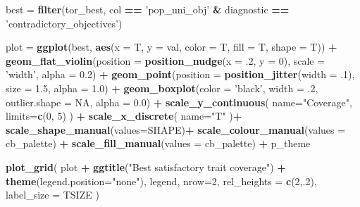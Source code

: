 \documentclass[]{book}
\newenvironment{Shaded}{\begin{snugshade}}{\end{snugshade}}
\newcommand{\DataTypeTok}[1]{\textcolor[rgb]{0.13,0.29,0.53}{#1}}
\newcommand{\DecValTok}[1]{\textcolor[rgb]{0.00,0.00,0.81}{#1}}
\newcommand{\FloatTok}[1]{\textcolor[rgb]{0.00,0.00,0.81}{#1}}
\newcommand{\KeywordTok}[1]{\textcolor[rgb]{0.13,0.29,0.53}{\textbf{#1}}}
\newcommand{\NormalTok}[1]{#1}
\newcommand{\OperatorTok}[1]{\textcolor[rgb]{0.81,0.36,0.00}{\textbf{#1}}}
\newcommand{\OtherTok}[1]{\textcolor[rgb]{0.56,0.35,0.01}{#1}}
\newcommand{\StringTok}[1]{\textcolor[rgb]{0.31,0.60,0.02}{#1}}
\begin{document}
\begin{Shaded}
\begin{Highlighting}[]
\NormalTok{best =}\StringTok{ }\KeywordTok{filter}\NormalTok{(tor_best, col }\OperatorTok{==}\StringTok{ 'pop_uni_obj'} \OperatorTok{&}\StringTok{ }\NormalTok{diagnostic }\OperatorTok{==}\StringTok{ 'contradictory_objectives'}\NormalTok{)}

\NormalTok{plot =}\StringTok{ }\KeywordTok{ggplot}\NormalTok{(best, }\KeywordTok{aes}\NormalTok{(}\DataTypeTok{x =}\NormalTok{ T, }\DataTypeTok{y =}\NormalTok{ val, }\DataTypeTok{color =}\NormalTok{ T, }\DataTypeTok{fill =}\NormalTok{ T, }\DataTypeTok{shape =}\NormalTok{ T)) }\OperatorTok{+}
\StringTok{  }\KeywordTok{geom_flat_violin}\NormalTok{(}\DataTypeTok{position =} \KeywordTok{position_nudge}\NormalTok{(}\DataTypeTok{x =} \FloatTok{.2}\NormalTok{, }\DataTypeTok{y =} \DecValTok{0}\NormalTok{), }\DataTypeTok{scale =} \StringTok{'width'}\NormalTok{, }\DataTypeTok{alpha =} \FloatTok{0.2}\NormalTok{) }\OperatorTok{+}
\StringTok{  }\KeywordTok{geom_point}\NormalTok{(}\DataTypeTok{position =} \KeywordTok{position_jitter}\NormalTok{(}\DataTypeTok{width =} \FloatTok{.1}\NormalTok{), }\DataTypeTok{size =} \FloatTok{1.5}\NormalTok{, }\DataTypeTok{alpha =} \FloatTok{1.0}\NormalTok{) }\OperatorTok{+}
\StringTok{  }\KeywordTok{geom_boxplot}\NormalTok{(}\DataTypeTok{color =} \StringTok{'black'}\NormalTok{, }\DataTypeTok{width =} \FloatTok{.2}\NormalTok{, }\DataTypeTok{outlier.shape =} \OtherTok{NA}\NormalTok{, }\DataTypeTok{alpha =} \FloatTok{0.0}\NormalTok{) }\OperatorTok{+}
\StringTok{  }\KeywordTok{scale_y_continuous}\NormalTok{(}
    \DataTypeTok{name=}\StringTok{"Coverage"}\NormalTok{,}
    \DataTypeTok{limits=}\KeywordTok{c}\NormalTok{(}\DecValTok{0}\NormalTok{, }\DecValTok{5}\NormalTok{)}
\NormalTok{  ) }\OperatorTok{+}
\StringTok{  }\KeywordTok{scale_x_discrete}\NormalTok{(}
    \DataTypeTok{name=}\StringTok{"T"}
\NormalTok{  )}\OperatorTok{+}
\StringTok{  }\KeywordTok{scale_shape_manual}\NormalTok{(}\DataTypeTok{values=}\NormalTok{SHAPE)}\OperatorTok{+}
\StringTok{  }\KeywordTok{scale_colour_manual}\NormalTok{(}\DataTypeTok{values =}\NormalTok{ cb_palette) }\OperatorTok{+}
\StringTok{  }\KeywordTok{scale_fill_manual}\NormalTok{(}\DataTypeTok{values =}\NormalTok{ cb_palette) }\OperatorTok{+}
\StringTok{  }\NormalTok{p_theme}

\KeywordTok{plot_grid}\NormalTok{(}
\NormalTok{  plot }\OperatorTok{+}
\StringTok{    }\KeywordTok{ggtitle}\NormalTok{(}\StringTok{"Best satisfactory trait coverage"}\NormalTok{) }\OperatorTok{+}
\StringTok{    }\KeywordTok{theme}\NormalTok{(}\DataTypeTok{legend.position=}\StringTok{"none"}\NormalTok{),}
\NormalTok{  legend,}
  \DataTypeTok{nrow=}\DecValTok{2}\NormalTok{,}
  \DataTypeTok{rel_heights =} \KeywordTok{c}\NormalTok{(}\DecValTok{2}\NormalTok{,.}\DecValTok{2}\NormalTok{),}
  \DataTypeTok{label_size =}\NormalTok{ TSIZE}
\NormalTok{)}
\end{Highlighting}
\end{Shaded}
\end{document}
